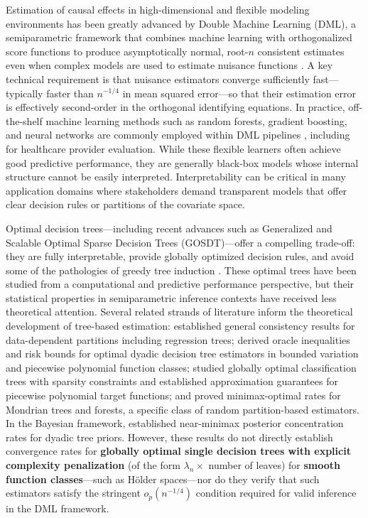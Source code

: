\documentclass[12pt]{article}
\begin{document}
Estimation of causal effects in high-dimensional and flexible modeling environments has been greatly advanced by Double Machine Learning (DML), a semiparametric framework that combines machine learning with orthogonalized score functions to produce asymptotically normal, root-$n$ consistent estimates even when complex models are used to estimate nuisance functions \citep{chernozhukov2018}. A key technical requirement is that nuisance estimators converge sufficiently fast---typically faster than $n^{-1/4}$ in mean squared error---so that their estimation error is effectively second-order in the orthogonal identifying equations. In practice, off-the-shelf machine learning methods such as random forests, gradient boosting, and neural networks are commonly employed within DML pipelines \citep{bach2021, susmann2025}, including for healthcare provider evaluation. While these flexible learners often achieve good predictive performance, they are generally black-box models whose internal structure cannot be easily interpreted. Interpretability can be critical in many application domains where stakeholders demand transparent models that offer clear decision rules or partitions of the covariate space.

Optimal decision trees---including recent advances such as Generalized and Scalable Optimal Sparse Decision Trees (GOSDT)---offer a compelling trade-off: they are fully interpretable, provide globally optimized decision rules, and avoid some of the pathologies of greedy tree induction \citep{lin2020}. These optimal trees have been studied from a computational and predictive performance perspective, but their statistical properties in semiparametric inference contexts have received less theoretical attention. Several related strands of literature inform the theoretical development of tree-based estimation: \citet{nobel1996histogram} established general consistency results for data-dependent partitions including regression trees; \citet{chatterjee2019adaptive} derived oracle inequalities and risk bounds for optimal dyadic decision tree estimators in bounded variation and piecewise polynomial function classes; \citet{bertsimas2017optimal} studied globally optimal classification trees with sparsity constraints and established approximation guarantees for piecewise polynomial target functions; and \citet{mourtada2018minimax} proved minimax-optimal rates for Mondrian trees and forests, a specific class of random partition-based estimators. In the Bayesian framework, \citet{vanderpas2017bayesian} established near-minimax posterior concentration rates for dyadic tree priors. However, these results do not directly establish convergence rates for \textbf{globally optimal single decision trees with explicit complexity penalization} (of the form $\lambda_n \times$ number of leaves) for \textbf{smooth function classes}---such as Hölder spaces---nor do they verify that such estimators satisfy the stringent $o_p(n^{-1/4})$ condition required for valid inference in the DML framework.
\end{document}
